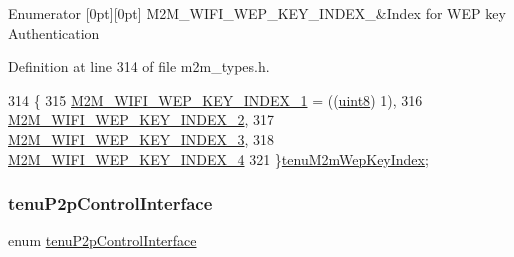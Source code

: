 \begin{DoxyEnumFields}{Enumerator}
[0pt][0pt]{}\mbox{\label{group__WlanEnums_gga43e100b0ae55a0b7000e5eaeaac24b8da59eea9302324b933e56fe7f408b89958}} 
M2\+M\+\_\+\+W\+I\+F\+I\+\_\+\+W\+E\+P\+\_\+\+K\+E\+Y\+\_\+\+I\+N\+D\+E\+X\+\_&Index for W\+EP key Authentication \\
\hline

\end{DoxyEnumFields}


Definition at line 314 of file m2m\+\_\+types.\+h.


\begin{DoxyCode}
314              \{
315     \hyperlink{group__WlanEnums_gga43e100b0ae55a0b7000e5eaeaac24b8da975f3c41163a8ad0d7fbf336f230cb6b}{M2M\_WIFI\_WEP\_KEY\_INDEX\_1} = ((\hyperlink{group__DataT_ga4df709a77647e870bbf1d955b8edc9a6}{uint8}) 1),
316     \hyperlink{group__WlanEnums_gga43e100b0ae55a0b7000e5eaeaac24b8dac2411225cfc2e64d2c6cf8d618f5fb2a}{M2M\_WIFI\_WEP\_KEY\_INDEX\_2},
317     \hyperlink{group__WlanEnums_gga43e100b0ae55a0b7000e5eaeaac24b8da2f27c8c07af4152703d4302a8671edc4}{M2M\_WIFI\_WEP\_KEY\_INDEX\_3},
318     \hyperlink{group__WlanEnums_gga43e100b0ae55a0b7000e5eaeaac24b8da59eea9302324b933e56fe7f408b89958}{M2M\_WIFI\_WEP\_KEY\_INDEX\_4}
321 \}\hyperlink{group__WlanEnums_ga43e100b0ae55a0b7000e5eaeaac24b8d}{tenuM2mWepKeyIndex};
\end{DoxyCode}
\mbox{\label{group__WlanEnums_gaa1d900506fae03d738ed81234d0a4633}} 
\subsubsection{\texorpdfstring{tenu\+P2p\+Control\+Interface}{tenuP2pControlInterface}}
{\footnotesize\ttfamily enum \hyperlink{group__WlanEnums_gaa1d900506fae03d738ed81234d0a4633}{tenu\+P2p\+Control\+Interface}}



